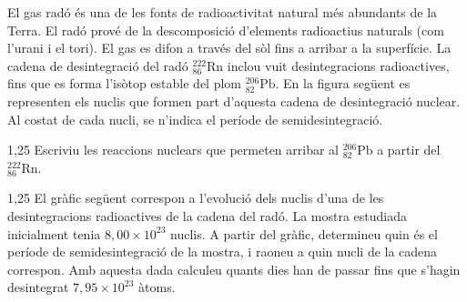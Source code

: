 El gas radó és una de les fonts de radioactivitat natural més abundants de la Terra. El radó prové de la descomposició d'elements radioactius naturals (com l'urani i el tori). El gas es difon a través del sòl fins a arribar a la superfície. La cadena de desintegració del radó $^{222}_{86}\mathrm{Rn}$ inclou vuit desintegracions radioactives, fins que es forma l'isòtop estable del plom $^{206}_{82}\mathrm{Pb}$. En la figura següent es representen els nuclis que formen part d'aquesta cadena de desintegració nuclear. Al costat de cada nucli, se n'indica el període de semidesintegració.


\begin{apartat}{1,25}
Escriviu les reaccions nuclears que permeten arribar al $^{206}_{82}\mathrm{Pb}$ a partir del $^{222}_{86}\mathrm{Rn}$.
\end{apartat}

\begin{apartat}{1,25}
El gràfic següent correspon a l'evolució dels nuclis d'una de les desintegracions radioactives de la cadena del radó. La mostra estudiada inicialment tenia $8,00\times 10^{23}$ nuclis. A partir del gràfic, determineu quin és el període de semidesintegració de la mostra, i raoneu a quin nucli de la cadena correspon. Amb aquesta dada calculeu quants dies han de passar fins que s'hagin desintegrat $7,95\times 10^{23}$ àtoms.

\end{apartat}
